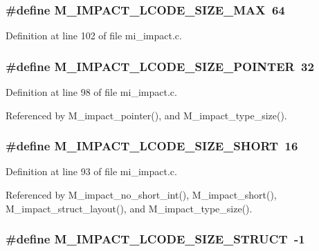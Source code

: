 \subsubsection{\setlength{\rightskip}{0pt plus 5cm}\#define M\_\-IMPACT\_\-LCODE\_\-SIZE\_\-MAX~64}\label{mi__impact_8c_84d2fa57893bb0c937bf7c7a105b68bb}




Definition at line 102 of file mi\_\-impact.c.
\subsubsection{\setlength{\rightskip}{0pt plus 5cm}\#define M\_\-IMPACT\_\-LCODE\_\-SIZE\_\-POINTER~32}\label{mi__impact_8c_773afd4ad4800a7ef7feed25d45198fa}




Definition at line 98 of file mi\_\-impact.c.

Referenced by M\_\-impact\_\-pointer(), and M\_\-impact\_\-type\_\-size().
\subsubsection{\setlength{\rightskip}{0pt plus 5cm}\#define M\_\-IMPACT\_\-LCODE\_\-SIZE\_\-SHORT~16}\label{mi__impact_8c_7c68a57b7ecc2d917ad077685f57e834}




Definition at line 93 of file mi\_\-impact.c.

Referenced by M\_\-impact\_\-no\_\-short\_\-int(), M\_\-impact\_\-short(), M\_\-impact\_\-struct\_\-layout(), and M\_\-impact\_\-type\_\-size().
\subsubsection{\setlength{\rightskip}{0pt plus 5cm}\#define M\_\-IMPACT\_\-LCODE\_\-SIZE\_\-STRUCT~-1}\label{mi__impact_8c_e061aa43f98a25731da8d03cf56840b1}





